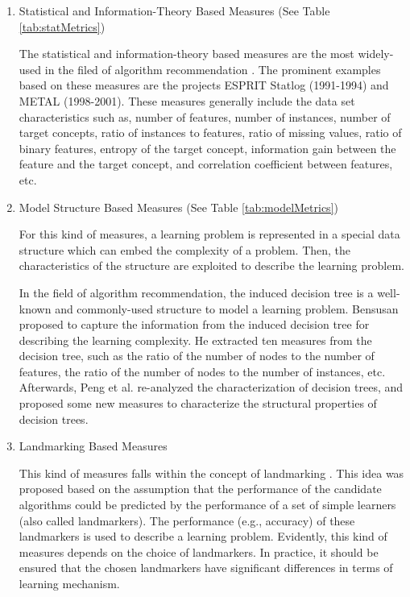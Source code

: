 \documentclass[prodmode,acmtkdd]{acmsmall}
\begin{document}
\begin{enumerate}
    \item {Statistical and Information-Theory Based Measures} (See Table \ref{tab:statMetrics})

    The statistical and information-theory based measures are the most
    widely-used in the filed of algorithm recommendation
    \cite{brazdil2003ranking,king1995statlog,sohn1999meta,Henery1995methods,aha1992generalizing}.
    The prominent examples based on these measures are the projects
    ESPRIT Statlog (1991-1994) and METAL (1998-2001). These measures
    generally include the data set characteristics such as, number of
    features, number of instances, number of target concepts, ratio of
    instances to features, ratio of missing values, ratio of binary
    features, entropy of the target concept, information gain between
    the feature and the target concept, and correlation coefficient
    between features, etc.

    \item {Model Structure Based Measures} (See Table \ref{tab:modelMetrics})

    For this kind of measures, a learning problem is represented in a
    special data structure which can embed the complexity of a problem.
    Then, the characteristics of the structure are exploited to describe
    the learning problem.

    \quad In the field of algorithm recommendation, the induced decision
    tree is a well-known and commonly-used structure to model a learning
    problem. Bensusan \citeyear{Bensusan1998god} proposed to capture the
    information from the induced decision tree for describing the
    learning complexity. He extracted ten measures from the decision
    tree, such as the ratio of the number of nodes to the number of
    features, the ratio of the number of nodes to the number of
    instances, etc. Afterwards, Peng et al. \citeyear{peng2002improved}
    re-analyzed the characterization of decision trees, and proposed
    some new measures to characterize the structural properties of
    decision trees.

    \item {Landmarking Based Measures}

    This kind of measures falls within the concept of landmarking
    \cite{Pfahringer00meta,Bensusan2000casa,jain2000statistical,duin2004characterization}.
    This idea was proposed based on the assumption that the performance
    of the candidate algorithms could be predicted by the performance of
    a set of simple learners (also called landmarkers). The performance
    (e.g., accuracy) of these landmarkers is used to describe a learning
    problem. Evidently, this kind of measures depends on the choice of
    landmarkers. In practice, it should be ensured that the chosen
    landmarkers have significant differences in terms of learning
    mechanism.


\end{enumerate}
\end{document}
